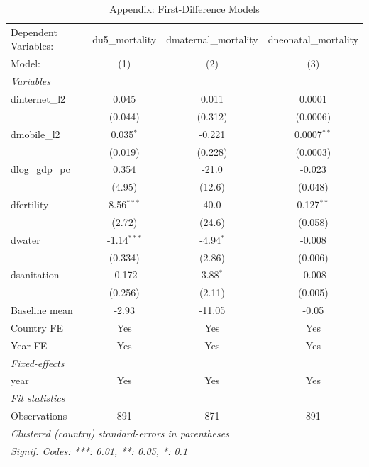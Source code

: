 \begin{table}[htbp]
   \caption{\label{tab:appendix_first_difference} Appendix: First-Difference Models}
   \centering
   \begin{tabular}{lccc}
      \tabularnewline \midrule \midrule
      Dependent Variables: & du5\_mortality  & dmaternal\_mortality  & dneonatal\_mortality\\   
      Model:               & (1)             & (2)                   & (3)\\  
      \midrule
      \emph{Variables}\\
      dinternet\_l2        & 0.045           & 0.011                 & 0.0001\\   
                           & (0.044)         & (0.312)               & (0.0006)\\   
      dmobile\_l2          & 0.035$^{*}$     & -0.221                & 0.0007$^{**}$\\   
                           & (0.019)         & (0.228)               & (0.0003)\\   
      dlog\_gdp\_pc        & 0.354           & -21.0                 & -0.023\\   
                           & (4.95)          & (12.6)                & (0.048)\\   
      dfertility           & 8.56$^{***}$    & 40.0                  & 0.127$^{**}$\\   
                           & (2.72)          & (24.6)                & (0.058)\\   
      dwater               & -1.14$^{***}$   & -4.94$^{*}$           & -0.008\\   
                           & (0.334)         & (2.86)                & (0.006)\\   
      dsanitation          & -0.172          & 3.88$^{*}$            & -0.008\\   
                           & (0.256)         & (2.11)                & (0.005)\\   
      Baseline mean        & -2.93           & -11.05                & -0.05\\  
      Country FE           & Yes             & Yes                   & Yes\\  
      Year FE              & Yes             & Yes                   & Yes\\  
      \midrule
      \emph{Fixed-effects}\\
      year                 & Yes             & Yes                   & Yes\\  
      \midrule
      \emph{Fit statistics}\\
      Observations         & 891             & 871                   & 891\\  
      \midrule \midrule
      \multicolumn{4}{l}{\emph{Clustered (country) standard-errors in parentheses}}\\
      \multicolumn{4}{l}{\emph{Signif. Codes: ***: 0.01, **: 0.05, *: 0.1}}\\
   \end{tabular}
\end{table}
